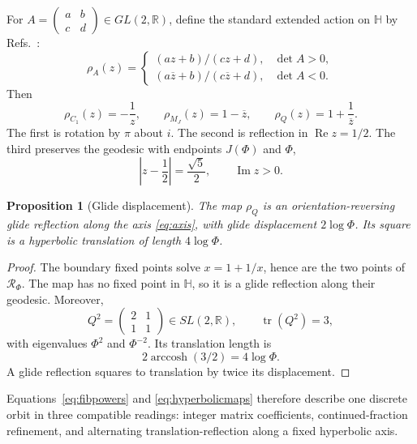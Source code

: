 \documentclass[10pt,oneside]{article}
\theoremstyle{plaincompact}
\newtheorem{proposition}[theorem]{Proposition}
\theoremstyle{definitioncompact}
\newcommand{\R}{\mathbb R}
\newcommand{\Hh}{\mathbb H}
\newcommand{\Tr}{\operatorname{tr}}
\begin{document}
For $A=\left(\begin{smallmatrix}a&b\\c&d\end{smallmatrix}\right)\in
GL(2,\R)$, define the standard extended action on $\Hh$ by
Refs.~\cite{Beardon,Lang}:
\begin{equation}\label{eq:extendedaction}
\rho_A(z)=
\begin{cases}
(az+b)/(cz+d),&\det A>0,\\[3pt]
(a\overline z+b)/(c\overline z+d),&\det A<0.
\end{cases}
\end{equation}
Then
\begin{equation}\label{eq:hyperbolicmaps}
\rho_{C_1}(z)=-\frac1z,\qquad
\rho_{M_J}(z)=1-\overline z,\qquad
\rho_Q(z)=1+\frac1{\overline z}.
\end{equation}
The first is rotation by $\pi$ about $i$.  The second is reflection in
$\operatorname{Re}z=1/2$.  The third preserves the geodesic with endpoints
$J(\Phi)$ and $\Phi$,
\begin{equation}\label{eq:axis}
\left|z-\frac12\right|=\frac{\sqrt5}{2},\qquad \operatorname{Im}z>0.
\end{equation}

\begin{proposition}[Glide displacement]\label{prop:glide}
The map $\rho_Q$ is an orientation-reversing glide reflection along the axis
\eqref{eq:axis}, with glide displacement $2\log\Phi$.  Its square is a
hyperbolic translation of length $4\log\Phi$.
\end{proposition}

\begin{proof}
The boundary fixed points solve $x=1+1/x$, hence are the two points of
$\mathcal R_\Phi$.  The map has no fixed point in $\Hh$, so it is a glide
reflection along their geodesic.  Moreover,
\[
Q^2=\begin{pmatrix}2&1\\1&1\end{pmatrix}\in SL(2,\R),
\qquad \Tr(Q^2)=3,
\]
with eigenvalues $\Phi^2$ and $\Phi^{-2}$.  Its translation length is
\begin{equation}\label{eq:translationlength}
2\operatorname{arccosh}(3/2)=4\log\Phi.
\end{equation}
A glide reflection squares to translation by twice its displacement.
\end{proof}

Equations~\eqref{eq:fibpowers} and \eqref{eq:hyperbolicmaps} therefore describe
one discrete orbit in three compatible readings: integer matrix coefficients,
continued-fraction refinement, and alternating translation-reflection along a
fixed hyperbolic axis.
\end{document}

